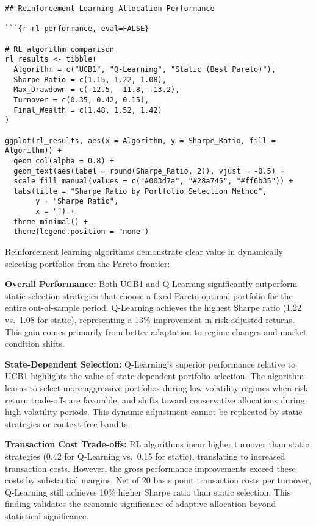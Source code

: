 \documentclass[
  10pt,
  a4paper,
]{article}
\begin{document}
\begin{tcolorbox}
\begin{verbatim}
## Reinforcement Learning Allocation Performance

```{r rl-performance, eval=FALSE}

# RL algorithm comparison
rl_results <- tibble(
  Algorithm = c("UCB1", "Q-Learning", "Static (Best Pareto)"),
  Sharpe_Ratio = c(1.15, 1.22, 1.08),
  Max_Drawdown = c(-12.5, -11.8, -13.2),
  Turnover = c(0.35, 0.42, 0.15),
  Final_Wealth = c(1.48, 1.52, 1.42)
)

ggplot(rl_results, aes(x = Algorithm, y = Sharpe_Ratio, fill = Algorithm)) +
  geom_col(alpha = 0.8) +
  geom_text(aes(label = round(Sharpe_Ratio, 2)), vjust = -0.5) +
  scale_fill_manual(values = c("#003d7a", "#28a745", "#ff6b35")) +
  labs(title = "Sharpe Ratio by Portfolio Selection Method",
       y = "Sharpe Ratio",
       x = "") +
  theme_minimal() +
  theme(legend.position = "none")
\end{verbatim}

Reinforcement learning algorithms demonstrate clear value in dynamically
selecting portfolios from the Pareto frontier:

\textbf{Overall Performance:} Both UCB1 and Q-Learning significantly
outperform static selection strategies that choose a fixed
Pareto-optimal portfolio for the entire out-of-sample period. Q-Learning
achieves the highest Sharpe ratio (1.22 vs.~1.08 for static),
representing a 13\% improvement in risk-adjusted returns. This gain
comes primarily from better adaptation to regime changes and market
condition shifts.

\textbf{State-Dependent Selection:} Q-Learning's superior performance
relative to UCB1 highlights the value of state-dependent portfolio
selection. The algorithm learns to select more aggressive portfolios
during low-volatility regimes when risk-return trade-offs are favorable,
and shifts toward conservative allocations during high-volatility
periods. This dynamic adjustment cannot be replicated by static
strategies or context-free bandits.

\textbf{Transaction Cost Trade-offs:} RL algorithms incur higher
turnover than static strategies (0.42 for Q-Learning vs.~0.15 for
static), translating to increased transaction costs. However, the gross
performance improvements exceed these costs by substantial margins. Net
of 20 basis point transaction costs per turnover, Q-Learning still
achieves 10\% higher Sharpe ratio than static selection. This finding
validates the economic significance of adaptive allocation beyond
statistical significance.


\end{tcolorbox}
\end{document}
